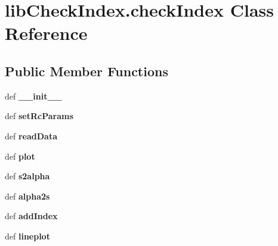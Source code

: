 \hypertarget{classlibCheckIndex_1_1checkIndex}{\section{lib\-Check\-Index.\-check\-Index Class Reference}
\label{classlibCheckIndex_1_1checkIndex}
}
\subsection*{Public Member Functions}
\begin{DoxyCompactItemize}
\item 
\hypertarget{classlibCheckIndex_1_1checkIndex_a0faa3f5072993a165ae9e9f1a0c999e6}{def {\bfseries \-\_\-\-\_\-init\-\_\-\-\_\-}}\label{classlibCheckIndex_1_1checkIndex_a0faa3f5072993a165ae9e9f1a0c999e6}

\item 
\hypertarget{classlibCheckIndex_1_1checkIndex_ab74e4401c62ad08c99353ba14e86a043}{def {\bfseries set\-Rc\-Params}}\label{classlibCheckIndex_1_1checkIndex_ab74e4401c62ad08c99353ba14e86a043}

\item 
\hypertarget{classlibCheckIndex_1_1checkIndex_af947d46e4367a51d0c1d3c8b57e32bf1}{def {\bfseries read\-Data}}\label{classlibCheckIndex_1_1checkIndex_af947d46e4367a51d0c1d3c8b57e32bf1}

\item 
\hypertarget{classlibCheckIndex_1_1checkIndex_a7a52f71a5a95d95a6ab6c523e976f45b}{def {\bfseries plot}}\label{classlibCheckIndex_1_1checkIndex_a7a52f71a5a95d95a6ab6c523e976f45b}

\item 
\hypertarget{classlibCheckIndex_1_1checkIndex_a0f4edb4bda57904eeb8925e8b4317685}{def {\bfseries s2alpha}}\label{classlibCheckIndex_1_1checkIndex_a0f4edb4bda57904eeb8925e8b4317685}

\item 
\hypertarget{classlibCheckIndex_1_1checkIndex_ae746c5ac818df7212e2aba4bb6cedfd3}{def {\bfseries alpha2s}}\label{classlibCheckIndex_1_1checkIndex_ae746c5ac818df7212e2aba4bb6cedfd3}

\item 
\hypertarget{classlibCheckIndex_1_1checkIndex_a812367099e8fbca694963681388fe084}{def {\bfseries add\-Index}}\label{classlibCheckIndex_1_1checkIndex_a812367099e8fbca694963681388fe084}

\item 
\hypertarget{classlibCheckIndex_1_1checkIndex_a8b8ad66b816ee0c3d620ccfa83b38299}{def {\bfseries lineplot}}\label{classlibCheckIndex_1_1checkIndex_a8b8ad66b816ee0c3d620ccfa83b38299}


\end{DoxyCompactItemize}
